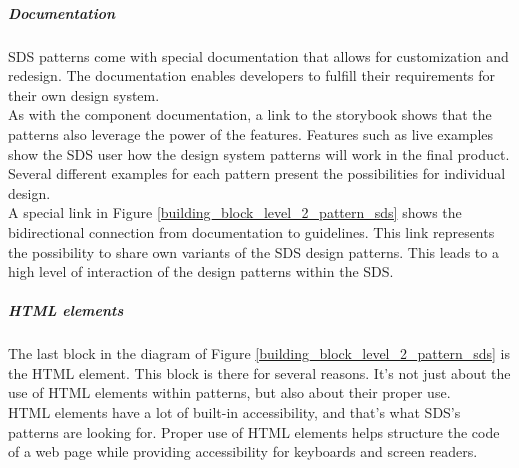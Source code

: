 \subparagraph{Documentation}
\ac{SDS} patterns come with special documentation that allows for customization and redesign. The documentation enables developers to fulfill their requirements for their own design system.\\
As with the component documentation, a link to the storybook shows that the patterns also leverage the power of the features. Features such as live examples show the \ac{SDS} user how the design system patterns will work in the final product. Several different examples for each pattern present the possibilities for individual design. \\
A special link in Figure \ref{building_block_level_2_pattern_sds} shows the bidirectional connection from documentation to guidelines. This link represents the possibility to share own variants of the \ac{SDS} design patterns. This leads to a high level of interaction of the design patterns within the \acl{SDS}.

\subparagraph{\ac{HTML} elements}
The last block in the diagram of Figure \ref{building_block_level_2_pattern_sds} is the \ac{HTML} element. This block is there for several reasons. It's not just about the use of \ac{HTML} elements within patterns, but also about their proper use. \\
\ac{HTML} elements have a lot of built-in accessibility, and that's what SDS's patterns are looking for. Proper use of \ac{HTML} elements helps structure the code of a web page while providing accessibility for keyboards and screen readers. \citep{mdn_html_nodate}

